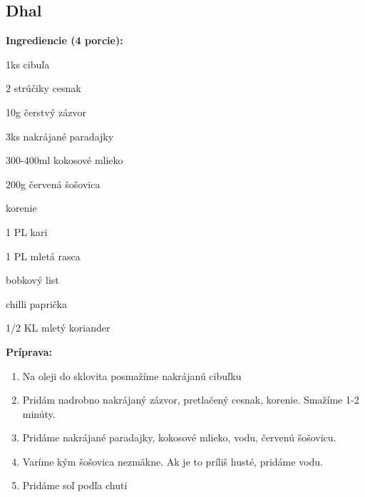 \setcounter{step}{0}

\subsection{ Dhal }

\begin{ingredient}
  
  \def\portions{  }
  \textbf{ {\normalsize Ingrediencie (4 porcie):} }

  \begin{main}
      \item 1ks cibuľa
      \item 2 strúčiky cesnak
      \item 10g čerstvý zázvor
      \item 3ks nakrájané paradajky
      \item 300-400ml kokosové mlieko
      \item 200g červená šošovica
  \end{main}
  
    \begin{subingredient}{korenie}
        \item 1 PL kari
        \item 1 PL mletá rasca
        \item bobkový list
        \item chilli paprička
        \item 1/2 KL mletý koriander
    \end{subingredient}
  
\end{ingredient}
\begin{recipe}
\textbf{ {\normalsize Príprava:} }
\begin{enumerate}

  \item{Na oleji do sklovita posmažíme nakrájanú cibuľku}
  \item{Pridám nadrobno nakrájaný zázvor, pretlačený cesnak, korenie. Smažíme 1-2 minúty.}
  \item{Pridáme nakrájané paradajky, kokosové mlieko, vodu, červenú šošovicu.}
  \item{Varíme kým šošovica nezmäkne. Ak je to príliš husté, pridáme vodu.}
  \item{Pridáme soľ podľa chuti}

\end{enumerate}
\end{recipe}

\begin{notes}
  
\end{notes}	
\clearpage
